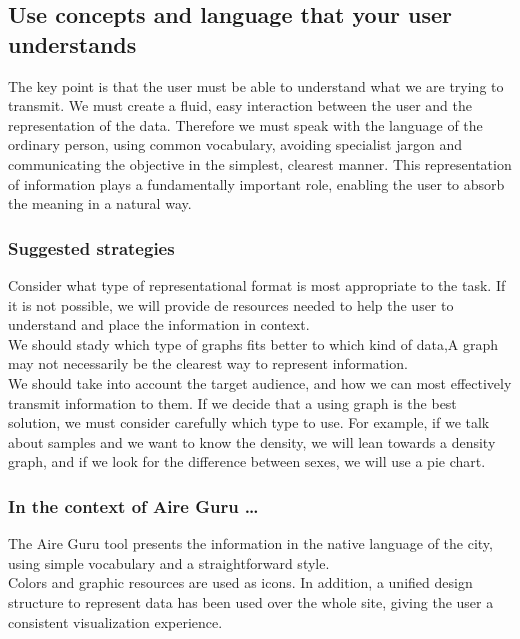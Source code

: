 \subsection{Use concepts and language that your user understands}

The key point is that the user must be able to understand what we are trying to transmit. We must create a fluid, 
easy interaction between the user and the representation of the data. Therefore we must speak with the language of 
the ordinary person, using common vocabulary, avoiding specialist jargon and communicating the objective in the simplest, 
clearest manner. This representation of information plays a fundamentally important role, enabling the user to absorb 
the meaning in a natural way.

\subsubsection*{Suggested strategies} 

Consider what type of representational format is most appropriate to the task. If it is not possible, we will provide de 
resources needed to help the user to understand and place the information in context. \\

We should stady which type of graphs fits better to which kind of data,A graph may not necessarily be the 
clearest way to represent information.\\

We should take into account the target audience, and how we can most effectively transmit information to them. 
If we decide that a using graph is the best solution, we must consider carefully which type to use. For example, 
if we talk about samples and we want to know the density, we will lean towards a density graph, and if we look for the difference
between sexes, we will use a pie chart.

\subsubsection*{In the context of Aire Guru \ldots} 

The Aire Guru tool presents the information in the native language of the city, using simple vocabulary and a 
straightforward style.\\
Colors and graphic resources are used as icons. In addition, a unified design structure to represent data has 
been used over the whole site, giving the user a consistent visualization experience. \\

